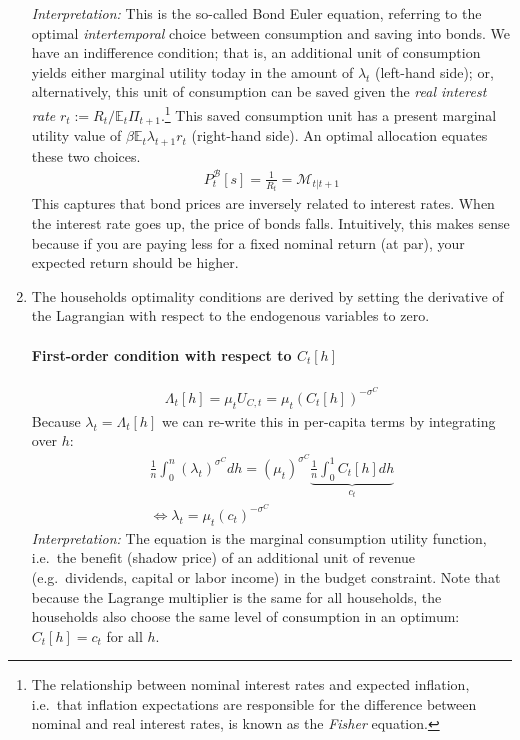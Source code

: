 \begin{enumerate}
\emph{Interpretation:}
This is the so-called Bond Euler equation,
 referring to the optimal \emph{intertemporal} choice between consumption and saving into bonds.
We have an indifference condition; that is,
  an additional unit of consumption yields either marginal utility today in the amount of \(\lambda_t\) (left-hand side);
or, alternatively, this unit of consumption can be saved given the \emph{real interest rate} \(r_{t} := R_{t}/\mathbb{E}_{t}\Pi_{t+1}\).\footnote{%
  The relationship between nominal interest rates and expected inflation, i.e.\
    that inflation expectations are responsible for the difference between nominal and real interest rates,
    is known as the \emph{Fisher} equation.}
This saved consumption unit has a present marginal utility value of \(\beta \mathbb{E}_{t} \lambda_{t+1} r_{t}\) (right-hand side).
An optimal allocation equates these two choices.
\begin{align*}
P^{\mathcal{B}}_{t}[s] = \frac{1}{R_{t}} = \mathcal{M}_{t|t+1}
\end{align*}
This captures that bond prices are inversely related to interest rates.
When the interest rate goes up, the price of bonds falls.
Intuitively, this makes sense because if you are paying less for a fixed nominal return (at par),
  your expected return should be higher.

\item
The households optimality conditions are derived by setting the derivative of the Lagrangian
  with respect to the endogenous variables to zero.

\paragraph{First-order condition with respect to \(C_{t}[h]\)}
\begin{align*}
\Lambda_{t}[h] = \mu_{t} U_{C,t} = \mu_{t} {(C_t[h])}^{-\sigma^{C}}
\end{align*}
Because \(\lambda_{t} = \Lambda_{t}[h]\) we can re-write this in per-capita terms by integrating over \(h\):
\begin{gather*}
\frac{1}{n} \int_{0}^{n} {(\lambda_{t})}^{\sigma^{C}} dh = {(\mu_{t})}^{\sigma^{C}} \underbrace{\frac{1}{n} \int_{0}^{1} C_t[h] dh}_{c_{t}}
\\
\Leftrightarrow
\lambda_{t} = \mu_{t} {(c_t)}^{-\sigma^{C}}
\end{gather*}
\emph{Interpretation:} The equation is the marginal consumption utility function, i.e.\
  the benefit (shadow price) of an additional unit of revenue (e.g.\ dividends, capital or labor income) in the budget constraint.
Note that because the Lagrange multiplier is the same for all households,
  the households also choose the same level of consumption in an optimum: \(C_{t}[h] = c_{t}\) for all \(h\).


\end{enumerate}
